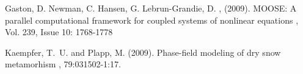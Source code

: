 \documentclass[twoside]{article}
\begin{document}
\begin{multicols}{2}
\begin{thebibliography}{50}
Gaston, D.  Newman, C. Hansen, G. Lebrun-Grandie, D. , (2009).
\newblock MOOSE: A parallel computational framework for coupled systems of nonlinear equations
, Vol. 239, Issue 10: 1768-1778 

Kaempfer, T.~U. and Plapp, M. (2009).
\newblock Phase-field modeling of dry snow metamorhism
, 79:031502-1:17.

\end{thebibliography}


\end{multicols}
\end{document}
